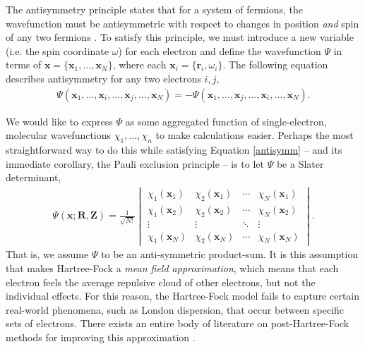 \documentclass[12pt]{article}
\newcommand{\vect}[1]{\boldsymbol{#1}}
\begin{document}
The antisymmetry principle states that for a system of fermions, the wavefunction must be antisymmetric with respect to changes in position \emph{and} spin of any two fermions \cite{sherrill2001}.  To satisfy this principle, we must introduce a new variable (i.e. the spin coordinate $\omega$) for each electron and define the wavefunction $\Psi$ in terms of $\vect{x} = \{\vect{x}_1, \ldots, \vect{x}_N\}$, where each $\vect{x}_i = \{\vect{r}_i, \omega_i\}$.  The following equation describes antisymmetry for any two electrons $i, j$,  
\begin{align}
\Psi(\vect{x}_1, \ldots, \vect{x}_i, \ldots, \vect{x}_j, \ldots, \vect{x}_N) = -\Psi(\vect{x}_1, \ldots, \vect{x}_j, \ldots, \vect{x}_i, \ldots, \vect{x}_N). \label{antisymm}
\end{align}  

We would like to express $\Psi$ as some aggregated function of single-electron, molecular wavefunctions $\chi_1, \ldots, \chi_n$ to make calculations easier.  Perhaps the most straightforward way to do this while satisfying Equation \ref{antisymm}  -- and its immediate corollary, the Pauli exclusion principle -- is to let $\Psi$ be a Slater determinant,
\begin{align}
\Psi(\vect{x}; \vect{R}, \vect{Z}) = \frac{1}{\sqrt{N!}} 
\begin{vmatrix}
\chi_1(\vect x_1) & \chi_2(\vect x_1)  & \cdots & \chi_N(\vect x_1) \\
\chi_1(\vect x_2) & \chi_2(\vect x_2)  & \cdots & \chi_N(\vect x_2) \\
\vdots & \vdots & \ddots & \vdots \\
\chi_1(\vect x_N) & \chi_2(\vect x_N) & \cdots & \chi_N(\vect x_N) 
\end{vmatrix}.
\end{align} 
That is, we assume $\Psi$ to be an anti-symmetric product-sum.  It is this assumption that makes Hartree-Fock a \emph{mean field approximation}, which means that each electron feels the average repulsive cloud of other electrons, but not the individual effects.  For this reason, the Hartree-Fock model fails to capture certain real-world phenomena, such as London dispersion, that occur between specific sets of electrons.  There exists an entire body of literature on post-Hartree-Fock methods for improving this approximation \cite{bartlett1994applications}.       
\end{document}

